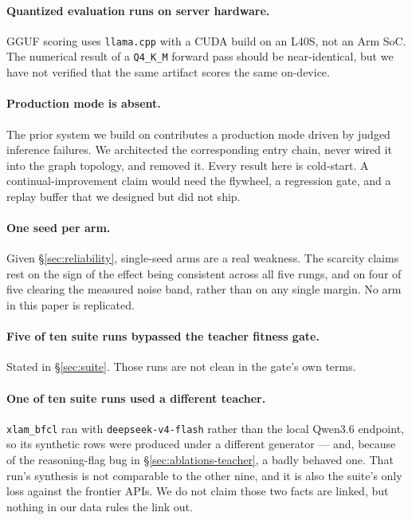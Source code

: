 \documentclass[sigconf,10pt]{acmart}
\newcommand{\xref}[1]{\S\ref{#1}}
\newcommand{\tsk}[1]{\texttt{#1}}
\begin{document}
\paragraph{Quantized evaluation runs on server hardware.} GGUF scoring uses
\texttt{llama.cpp} with a CUDA build on an L40S, not an Arm SoC. The numerical result of a
\texttt{Q4\_K\_M} forward pass should be near-identical, but we have not verified that the
same artifact scores the same on-device.

\paragraph{Production mode is absent.} The prior system we build on
contributes a production mode driven by judged inference failures. We architected the
corresponding entry chain, never wired it into the graph topology, and removed it. Every
result here is cold-start. A continual-improvement claim would need the flywheel, a regression
gate, and a replay buffer that we designed but did not ship.

\paragraph{One seed per arm.} Given \xref{sec:reliability}, single-seed arms are a real
weakness. The scarcity claims rest on the sign of the effect being consistent across all five
rungs, and on four of five clearing the measured noise band, rather than on any single margin.
No arm in this paper is replicated.

\paragraph{Five of ten suite runs bypassed the teacher fitness gate.} Stated in
\xref{sec:suite}. Those runs are not clean in the gate's own terms.

\paragraph{One of ten suite runs used a different teacher.} \tsk{xlam\_bfcl} ran with
\texttt{deepseek-v4-flash} rather than the local Qwen3.6 endpoint, so its synthetic rows were
produced under a different generator --- and, because of the reasoning-flag bug in
\xref{sec:ablations-teacher}, a badly behaved one. That run's synthesis is not comparable to
the other nine, and it is also the suite's only loss against the frontier APIs. We do not
claim those two facts are linked, but nothing in our data rules the link out.
\end{document}

